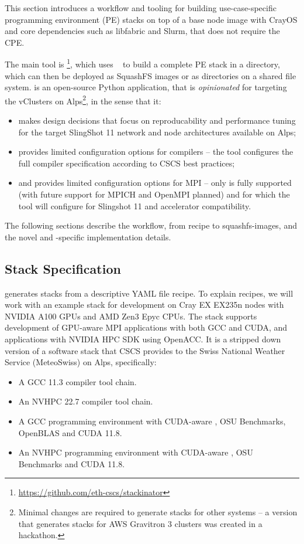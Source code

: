 This section introduces a workflow and tooling for building use-case-specific programming environment (PE) stacks on top of a base node image with CrayOS and core dependencies such as libfabric and Slurm, that does not require the CPE.

The main tool is \href{https://github.com/eth-cscs/stackinator}{\stackinator}\footnote{\url{https://github.com/eth-cscs/stackinator}}, which uses \spack~\cite{gamblin:sc15} to build a complete PE stack in a directory, which can then be deployed as SquashFS images or as directories on a shared file system.
\stackinator is an open-source Python application, that is \emph{opinionated} for targeting the vClusters on Alps\footnote{Minimal changes are required to generate stacks for other systems -- a version that generates stacks for AWS Gravitron 3 clusters was created in a hackathon.}, in the sense that it:
\begin{itemize}
    \item makes design decisions that focus on reproducability and performance tuning for the target SlingShot 11 network and node architectures available on Alps;
    \item provides limited configuration options for compilers -- the tool configures the full compiler specification according to CSCS best practices;
    \item and provides limited configuration options for MPI -- only \craympich is fully supported (with future support for MPICH and OpenMPI planned) and for which the tool will configure for Slingshot 11 and accelerator compatibility.
\end{itemize}

The following sections describe the workflow, from recipe to squashfs-images, and the novel and \crayex-specific implementation details.

\subsection{Stack Specification}

\stackinator generates stacks from a descriptive YAML file recipe.
To explain \spack recipes, we will work with an example stack for development on Cray EX EX235n nodes with NVIDIA A100 GPUs and AMD Zen3 Epyc CPUs.
The stack supports development of GPU-aware MPI applications with both GCC and CUDA, and applications with NVIDIA HPC SDK using OpenACC.
It is a stripped down version of a software stack that CSCS provides to the Swiss National Weather Service (MeteoSwiss) on Alps, specifically:
\begin{itemize}
    \item A GCC 11.3 compiler tool chain.
    \item An NVHPC 22.7 compiler tool chain.
    \item A GCC programming environment  with CUDA-aware \craympich, OSU Benchmarks, OpenBLAS and CUDA 11.8.
    \item An NVHPC programming environment  with CUDA-aware \craympich, OSU Benchmarks and CUDA 11.8.
\end{itemize}

